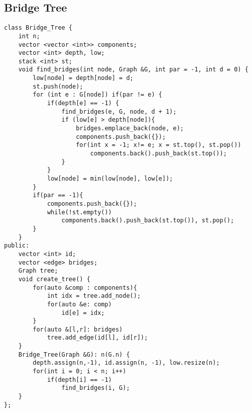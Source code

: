 \documentclass[FSZ,a4paper,onesided]{article}
\begin{document}
\begin{multicols*}{\COLS}
\subsection{Bridge Tree}
\begin{lstlisting}
class Bridge_Tree {
    int n;
    vector <vector <int>> components;
    vector <int> depth, low;
    stack <int> st;
    void find_bridges(int node, Graph &G, int par = -1, int d = 0) {
        low[node] = depth[node] = d;
        st.push(node);
        for (int e : G[node]) if(par != e) {
            if(depth[e] == -1) {
                find_bridges(e, G, node, d + 1);
                if (low[e] > depth[node]){
                    bridges.emplace_back(node, e);
                    components.push_back({});
                    for(int x = -1; x!= e; x = st.top(), st.pop()) 
                        components.back().push_back(st.top());
                }
            }
            low[node] = min(low[node], low[e]);
        }
        if(par == -1){
            components.push_back({});
            while(!st.empty())
                components.back().push_back(st.top()), st.pop();
        }   
    }
public:
    vector <int> id;
    vector <edge> bridges;
    Graph tree;
    void create_tree() {
        for(auto &comp : components){
            int idx = tree.add_node();
            for(auto &e: comp)
                id[e] = idx;
        }
        for(auto &[l,r]: bridges)
            tree.add_edge(id[l], id[r]);
    }
    Bridge_Tree(Graph &G): n(G.n) {
        depth.assign(n,-1), id.assign(n, -1), low.resize(n);
        for(int i = 0; i < n; i++)
            if(depth[i] == -1)
                find_bridges(i, G);
    }
};
\end{lstlisting}

\end{multicols*}
\end{document}

